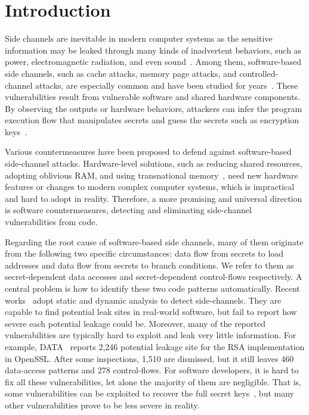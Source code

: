 \section{Introduction}
Side channels are inevitable in modern computer systems as the sensitive
information may be leaked through many kinds of inadvertent behaviors, such as power,
electromagnetic radiation, and even
sound~\cite{agrawal2002side,kar20178,chari1999towards,217605,genkin2014rsa}.
Among them, software-based side channels, such as cache attacks, memory page
attacks, and controlled-channel attacks, are especially common and have been
studied for
years~\cite{7163052,217543,217589,lee2017inferring,191010,liu2015last}. These
vulnerabilities result from vulnerable software and shared hardware components.
By observing the outputs or hardware behaviors, attackers can infer the program
execution flow that manipulates secrets and guess the secrets such as encryption
keys~\cite{Osvik2006,Gullasch:2011:CGB:2006077.2006784,203878,10.1007/978-3-540-45238-6_6}.

Various countermeasures have been proposed to defend against software-based
side-channel attacks. Hardware-level solutions, such as reducing shared
resources, adopting oblivious RAM, and using transnational
memory~\cite{203878,217537,shih2017t,Zhang:2015:HDL:2775054.2694372}, need new
hardware features or changes to modern complex computer systems, which is
impractical and hard to adopt in reality. Therefore, a more promising and
universal direction is software countermeasures, detecting and eliminating
side-channel vulnerabilities from code.

Regarding the root cause of software-based side channels, many of them originate
from the following two specific circumstances: data flow from secrets to load
addresses and data flow from secrets to branch conditions. We refer to them as
secret-dependent data accesses and secret-dependent control-flows respectively. A
central problem is how to identify these two code patterns automatically. Recent
works~\cite{203878,217537,Wichelmann:2018:MFF:3274694.3274741,Brotzman19Casym,236338,182946}
adopt static and dynamic analysis to detect side-channels. They are capable to find
potential leak sites in real-world software, but fail to report how severe each
potential leakage could be. Moreover, many of the reported vulnerabilities are typically
hard to exploit and leak very little information. For example,
DATA~\cite{217537} reports 2,246 potential leakage site for the RSA
implementation in OpenSSL\@. After some inspections, 1,510 are dismissed, but it
still leaves 460 data-access patterns and 278 control-flows. For software
developers, it is hard to fix all these vulnerabilities, let alone the majority
of them are negligible. That is, some vulnerabilities can be exploited to recover the
full secret keys~\cite{184415}, but many other vulnerabilities prove to be less
severe in reality.


